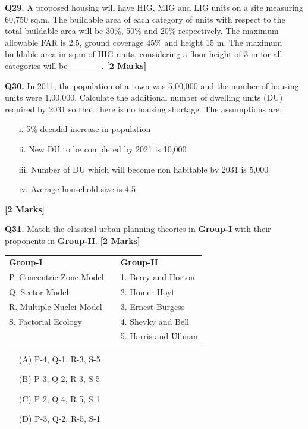 \documentclass[11pt]{article}
\newcommand{\questionb}[2]{
    \noindent\textbf{Q#2.} #1 \hfill \textbf{[2 Marks]}
}
\begin{document}
\vspace{0.5cm}

\questionb{A proposed housing will have HIG, MIG and LIG units on a site measuring 60,750 sq.m. The buildable area of each category of units with respect to the total buildable area will be 30\%, 50\% and 20\% respectively. The maximum allowable FAR is 2.5, ground coverage 45\% and height 15 m. The maximum buildable area in sq.m of HIG units, considering a floor height of 3 m for all categories will be \_\_\_\_\_.}{29}

\vspace{0.5cm}

\questionb{In 2011, the population of a town was 5,00,000 and the number of housing units were 1,00,000. Calculate the additional number of dwelling units (DU) required by 2031 so that there is no housing shortage. The assumptions are: 
\begin{itemize}
    \item[i.] 5\% decadal increase in population
    \item[ii.] New DU to be completed by 2021 is 10,000
    \item[iii.] Number of DU which will become non habitable by 2031 is 5,000
    \item[iv.] Average household size is 4.5
\end{itemize}}{30}

\vspace{0.5cm}

\questionb{Match the classical urban planning theories in \textbf{Group-I} with their proponents in \textbf{Group-II}.}{31}

\begin{tabularx}{\linewidth}{lXl}
\textbf{Group-I} & & \textbf{Group-II} \\
P. Concentric Zone Model & & 1. Berry and Horton \\
Q. Sector Model & & 2. Homer Hoyt \\
R. Multiple Nuclei Model & & 3. Ernest Burgess \\
S. Factorial Ecology & & 4. Shevky and Bell \\
& & 5. Harris and Ullman \\
\end{tabularx}

\begin{enumerate}
    \item[(A)] P-4, Q-1, R-3, S-5
    \item[(B)] P-3, Q-2, R-3, S-5  
    \item[(C)] P-2, Q-4, R-5, S-1
    \item[(D)] P-3, Q-2, R-5, S-1
\end{enumerate}
\end{document}
